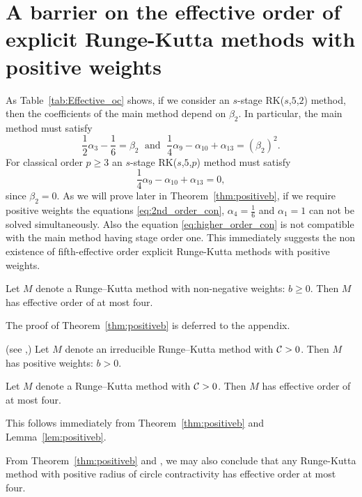 \section{A barrier on the effective order of explicit Runge-Kutta methods with positive weights}\label{sec:ExRK_barrier}

\indent As Table~\ref{tab:Effective_oc} shows, if we consider an $s$-stage RK($s$,$5$,$2$) method, then the coefficients of the main method depend on $\beta_2$. In particular, the main method must satisfy
\begin{equation}\label{eq:2nd_order_con}
    \frac{1}{2}\alpha_3 - \frac{1}{6} = \beta_2 \; \text{ and } \; \frac{1}{4}\alpha_9 - \alpha_{10} + \alpha_{13} = (\beta_2)^2.
\end{equation}
For classical order $p \geq 3$ an $s$-stage RK($s$,$5$,$p$) method must satisfy
\begin{equation}\label{eq:higher_order_con}
    \frac{1}{4}\alpha_9- \alpha_{10} + \alpha_{13} = 0,
\end{equation}
since $\beta_2 = 0$. As we will prove later in Theorem~\ref{thm:positiveb}, if we require positive weights the equations \eqref{eq:2nd_order_con}, $\alpha_4 = \frac{1}{6}$ and $\alpha_1 = 1$ can not be solved simultaneously. Also the equation \eqref{eq:higher_order_con} is not compatible with the main method having stage order one. This immediately suggests the non existence of fifth-effective order explicit Runge-Kutta methods with positive weights.

\begin{theorem}\label{thm:positiveb}
    Let $M$ denote a Runge--Kutta method with non-negative weights: $b\ge 0$.
    Then $M$ has effective order of at most four.
\end{theorem}
The proof of Theorem~\ref{thm:positiveb} is deferred to the appendix.

\begin{lemma}\label{lem:positiveb}(see \cite[Theorem~4.2]{Kraaijevanger1991},\cite[Lemma 4.2]{Ruuth2002})
Let $M$ denote an irreducible Runge--Kutta method with $\mathcal{C}>0$.  Then $M$ has positive weights:
$b>0$.
\end{lemma}

\begin{corollary}\label{cor:no-ssp-5}
    Let $M$ denote a Runge--Kutta method with $\mathcal{C}>0$.
    Then $M$ has effective order of at most four.
\end{corollary}
This follows immediately from Theorem~\ref{thm:positiveb} and Lemma~\ref{lem:positiveb}.

\begin{remark}
  From Theorem~\ref{thm:positiveb} and \cite[Theorem~4.1]{dahlquist2006}, we
  may also conclude that any Runge-Kutta method with positive radius of circle contractivity
  has effective order at most four.
\end{remark}


